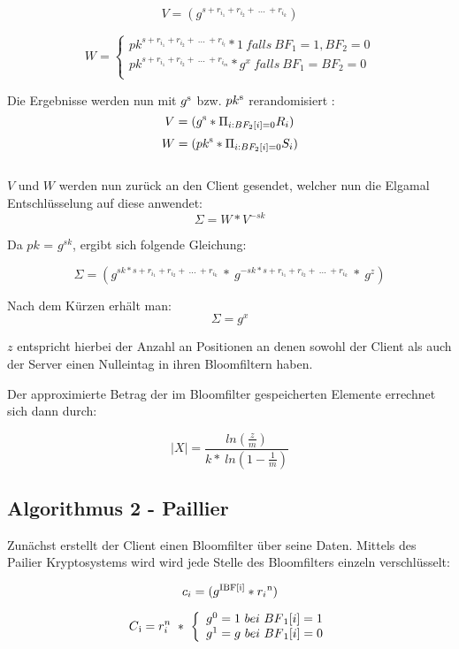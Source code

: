 $$ V = (g^{s + r_{i_{1}} + r_{i_{2}} + \ ...\ +r_{i_{k}}})$$

\[
W =\left\{
\begin{array}{ll}
pk^{s + r_{i_{1}} + r_{i_{2}} + \ ...\ +r_{i_{l}}}*1 \ falls \ BF_{1} = 1,BF_{2} = 0 \\
pk^{s + r_{i_{1}} + r_{i_{2}} + \ ...\ +r_{i_{m}}}*g^{x} \ falls \ BF_{1} = BF_{2} = 0\\
\end{array}
\right.
\]

Die Ergebnisse werden nun mit $ g \textsuperscript{s}  $ bzw. $ pk \textsuperscript{s} $ rerandomisiert :
$$ V = (g \textsuperscript{s} * \Pi_{i:BF_{2}[i] = 0} R_{i} )$$
$$ W = (pk \textsuperscript{s} * \Pi_{i:BF_{2}[i] = 0} S_{i} )$$ \\
$ V $ und $ W $ werden nun zurück an den Client gesendet, welcher nun die Elgamal Entschlüsselung auf diese anwendet:
$$\Sigma = W * V^{-sk}$$

Da $pk$ = $g^{sk}$, ergibt sich folgende Gleichung:
	
$$\Sigma = (g^{sk * s + r_{i_{1}} + r_{i_{2}} + \ ...\ +r_{i_{k}}} \ * \ g^{-sk * s + r_{i_{1}} + r_{i_{2}} + \ ...\ +r_{i_{k}}} \ * \ g^z) $$


Nach dem Kürzen erhält man:
$$\Sigma = g^x$$

$ z $ entspricht hierbei der Anzahl an Positionen an denen sowohl der Client als auch der Server einen Nulleintag in ihren Bloomfiltern haben.

Der approximierte Betrag der im Bloomfilter gespeicherten Elemente errechnet sich dann durch:

$$ |X| = \frac{ln( \frac{z}{m})}{k* \ ln(1- \frac{1}{m})}$$



\subsection{Algorithmus 2 - Paillier}
\label{sec:Sec2.3}

Zunächst erstellt der Client einen Bloomfilter über seine Daten.
Mittels des Pailier Kryptosystems wird wird jede Stelle des Bloomfilters einzeln verschlüsselt: 

$$c_i = (g \textsuperscript{IBF[i]}  * r_{i}\textsuperscript{n})$$

\[
C\textsubscript{i} = r_{i}^{n} \ * \ \left\{
\begin{array}{ll}
g^{0} = 1 \ bei \  BF\textsubscript{1}[i]=1\\
g^{1} = g \ bei \ BF\textsubscript{1}[i]=0\\
\end{array}
\right.
\]


